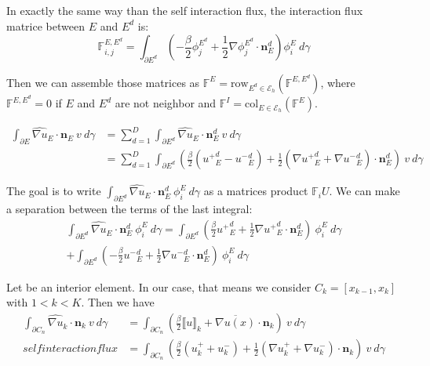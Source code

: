 \documentclass[a4paper,10pt,draft]{article}
\begin{document}
In exactly the same way than the self interaction flux, the interaction flux matrice between $E$ 
and $E^d$ is:
\begin{equation*}
 \mathbb{F}_{i,j}^{E,E^d} = \int_{\partial E^d} \left( -\frac{\beta}{2} \phi_j^{E^d} + \frac{1}{2} 
\nabla \phi_j^{E^d} \cdot \mathbf{n}_E^d \right) \phi_i^E \ d \gamma
\end{equation*}

Then we can assemble those matrices as $\mathbb{F}^E = \mathrm{row}_{E^d \in \mathcal{E}_h} 
(\mathbb{F}^{E,E^d})$, where $\mathbb{F}^{E,E^d} = 0$ if $E$ and $E^d$ are not neighbor and 
$\mathbb{F}^I = \mathrm{col}_{E \in \mathcal{E}_h} 
(\mathbb{F}^E)$.

\vspace{10cm}


\begin{align*}
  \int_{\partial E} \widehat{\nabla u}_E \cdot \mathbf{n}_E\ v\ d\gamma &=
  \sum_{d=1}^D \int_{\partial E^d} \widehat{\nabla u}_E \cdot \mathbf{n}_E^d\ v\ d\gamma \\
  &= \sum_{d=1}^D \int_{\partial E^d} \left(\frac{\beta}{2} ({u^+}_E^d - {u^-}_E^d) + \frac{1}{2} 
(\nabla {u^+}_E^d + \nabla {u^-}_E^d) \cdot \mathbf{n}_E^d \right)\ v\ d\gamma
\end{align*}

The goal is to write $\int_{\partial E^d} \widehat{\nabla u}_E \cdot \mathbf{n}_E^d\ \phi_i^E \ 
d\gamma$ as a matrices product $\mathbb{F}_i U$. We can make a separation between the terms of the 
last integral:
\begin{multline*}
 \int_{\partial E^d} \widehat{\nabla u}_E \cdot \mathbf{n}_E^d\ \phi_i^E \ d\gamma
= \int_{\partial E^d} \left( \frac{\beta}{2} {u^+}_E^d + \frac{1}{2} \nabla {u^+}_E^d \cdot 
\mathbf{n}_E^d \right) \ \phi_i^E\ d\gamma \\
+ \int_{\partial E^d} \left( -\frac{\beta}{2} {u^-}_E^d + \frac{1}{2} \nabla {u^-}_E^d \cdot 
\mathbf{n}_E^d \right) \ \phi_i^E\ d\gamma
 \end{multline*}

Let be an interior element. In our case, that means we consider $C_k = [x_{k-1},x_k]$ with $1<k<K$. 
Then we have
\begin{align*}
 \int_{\partial C_n} \widehat{\nabla u}_k \cdot \mathbf{n}_k\ v\ d\gamma &= \int_{\partial C_n} 
\left(\frac{\beta}{2} \llbracket u \rrbracket_k + \overline{\nabla u(x)} \cdot \mathbf{n}_k 
\right)\ v\ d\gamma \\self interaction flux
&= \int_{\partial C_n} \left(\frac{\beta}{2} (u^+_k + u^-_k) + \frac{1}{2} (\nabla u^+_k + \nabla 
u^-_k) \cdot \mathbf{n}_k \right)\ v\ d\gamma \\
\end{align*}
\end{document}
